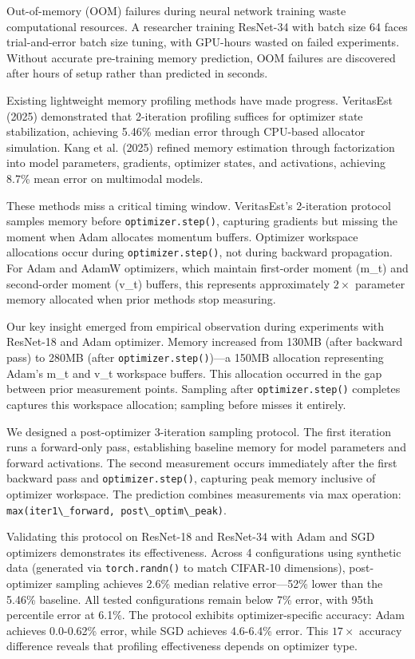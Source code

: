 
Out-of-memory (OOM) failures during neural network training waste computational resources. A researcher training ResNet-34 with batch size 64 faces trial-and-error batch size tuning, with GPU-hours wasted on failed experiments. Without accurate pre-training memory prediction, OOM failures are discovered after hours of setup rather than predicted in seconds.

Existing lightweight memory profiling methods have made progress. VeritasEst (2025) demonstrated that 2-iteration profiling suffices for optimizer state stabilization, achieving 5.46\% median error through CPU-based allocator simulation. Kang et al. (2025) refined memory estimation through factorization into model parameters, gradients, optimizer states, and activations, achieving 8.7\% mean error on multimodal models.

These methods miss a critical timing window. VeritasEst's 2-iteration protocol samples memory before \texttt{optimizer.step()}, capturing gradients but missing the moment when Adam allocates momentum buffers. Optimizer workspace allocations occur during \texttt{optimizer.step()}, not during backward propagation. For Adam and AdamW optimizers, which maintain first-order moment (m\_t) and second-order moment (v\_t) buffers, this represents approximately $2\times$ parameter memory allocated when prior methods stop measuring.

Our key insight emerged from empirical observation during experiments with ResNet-18 and Adam optimizer. Memory increased from 130MB (after backward pass) to 280MB (after \texttt{optimizer.step()})---a 150MB allocation representing Adam's m\_t and v\_t workspace buffers. This allocation occurred in the gap between prior measurement points. Sampling after \texttt{optimizer.step()} completes captures this workspace allocation; sampling before misses it entirely.

We designed a post-optimizer 3-iteration sampling protocol. The first iteration runs a forward-only pass, establishing baseline memory for model parameters and forward activations. The second measurement occurs immediately after the first backward pass and \texttt{optimizer.step()}, capturing peak memory inclusive of optimizer workspace. The prediction combines measurements via max operation: \texttt{max(iter1\textbackslash \_forward, post\textbackslash \_optim\textbackslash \_peak)}.

Validating this protocol on ResNet-18 and ResNet-34 with Adam and SGD optimizers demonstrates its effectiveness. Across 4 configurations using synthetic data (generated via \texttt{torch.randn()} to match CIFAR-10 dimensions), post-optimizer sampling achieves 2.6\% median relative error---52\% lower than the 5.46\% baseline. All tested configurations remain below 7\% error, with 95th percentile error at 6.1\%. The protocol exhibits optimizer-specific accuracy: Adam achieves 0.0-0.62\% error, while SGD achieves 4.6-6.4\% error. This $17\times$ accuracy difference reveals that profiling effectiveness depends on optimizer type.

